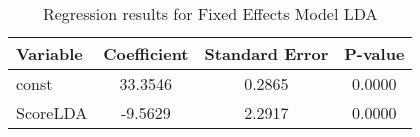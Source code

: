 \begin{table}[htbp]
\centering
\caption{Regression results for Fixed Effects Model LDA}
\begin{tabular}{lccc}
\hline
Variable & Coefficient & Standard Error & P-value \\ 
\hline
const & 33.3546 & 0.2865 & 0.0000 \\ 
ScoreLDA & -9.5629 & 2.2917 & 0.0000 \\ 
\hline
\end{tabular}
\end{table}

